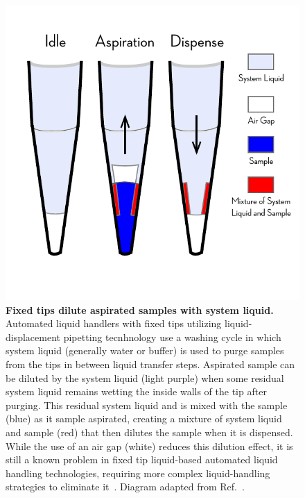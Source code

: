 \documentclass[aps,pre,twocolumn,nofootinbib,superscriptaddress,linenumbers]{revtex4-1}
\begin{document}
\begin{figure}[tb]
    \includegraphics[width=\columnwidth]{../figures/dilution_effect.pdf}

  \caption{{\bf Fixed tips dilute aspirated samples with system liquid.}
  Automated liquid handlers with fixed tips utilizing liquid-displacement pipetting tecnhnology use a washing cycle in which system liquid (generally water or buffer) is used to purge samples from the tips in between liquid transfer steps.
  Aspirated sample can be diluted by the system liquid (light purple) when some residual system liquid remains wetting the inside walls of the tip after purging.
  This residual system liquid and is mixed with the sample (blue) as it sample aspirated, creating a mixture of system liquid and sample (red) that then dilutes the sample when it is dispensed. 
  While the use of an air gap (white) reduces this dilution effect, it is still a known problem in fixed tip liquid-based automated liquid handling technologies, requiring more complex liquid-handling strategies to eliminate it~\cite{gu_dilution_2007}. 
  Diagram adapted from Ref.~\cite{gu_dilution_2007}. 
  }
  \label{fig:dilution_effect}
\end{figure}
\end{document}
